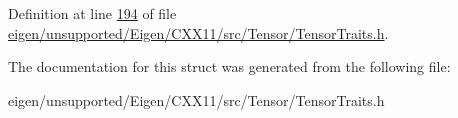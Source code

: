 Definition at line \hyperlink{eigen_2unsupported_2_eigen_2_c_x_x11_2src_2_tensor_2_tensor_traits_8h_source_l00194}{194} of file \hyperlink{eigen_2unsupported_2_eigen_2_c_x_x11_2src_2_tensor_2_tensor_traits_8h_source}{eigen/unsupported/\+Eigen/\+C\+X\+X11/src/\+Tensor/\+Tensor\+Traits.\+h}.



The documentation for this struct was generated from the following file\+:\begin{DoxyCompactItemize}
\item 
eigen/unsupported/\+Eigen/\+C\+X\+X11/src/\+Tensor/\+Tensor\+Traits.\+h\end{DoxyCompactItemize}
